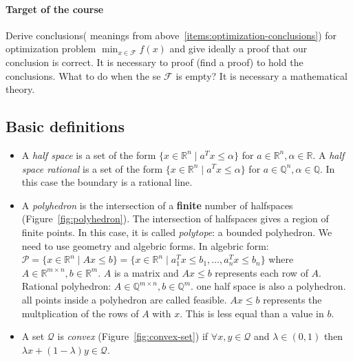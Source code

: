 \documentclass[main]{subfiles}
\begin{document}
\paragraph{Target of the course}
Derive conclusions( meanings from above~\ref{items:optimization-conclusions}) for optimization
problem $\displaystyle \min_{x \in \mathcal{F}} f(x)$ and give ideally a proof
that our conclusion is correct. It is necessary to proof (find a proof) to hold
the conclusions. What to do when the se $\mathcal{F}$ is empty? It is necessary
a mathematical theory.


\subsection{Basic definitions}
\begin{itemize}
\item A \emph{half space} is a set of the form $\{ x \in \mathbb{R}^{n} \mid
a^{T} x \leq \alpha \}$ for $a \in \mathbb{R}^{n}, \alpha \in \mathbb{R}$.
\subitem A \emph{half space rational} is a set of the form $\{ x \in
\mathbb{R}^{n} \mid a^{T} x \leq \alpha \}$ for $a \in \mathbb{Q}^{n}, \alpha
\in \mathbb{Q}$. In this case the boundary is a rational line.

\item A \emph{polyhedron} is the intersection of a \textbf{finite} number of
halfspaces (Figure~\ref{fig:polyhedron}). The intersection of halfspaces gives a
region of finite points. In this case, it is called \emph{polytope}: a bounded
polyhedron. We need to use geometry and algebric forms. In algebric form:
$\mathcal{P} = \{ x \in \mathbb{R}^{n} \mid Ax \leq b \} = \{ x \in
\mathbb{R}^{n} \mid a_{1}^{T}x \leq b_{1}, \dots, a_{n}^{T}x \leq b_{n} \}$
where $A \in \mathbb{R}^{m \times n}, b \in \mathbb{R}^{m}$. $A$ is a matrix
and $Ax \leq b$ represents each row of $A$.
\subitem Rational polyhedron: $A \in \mathbb{Q}^{ m \times n}, b \in
\mathbb{Q}^{m}$.
\subitem one half space is also a polyhedron.
\subitem all points inside a polyhedron are called feasible.
\subitem $Ax \leq b$ represents the multplication of the rows of $A$ with $x$. This is less equal than a value in $b$.

\item A set $\mathcal{Q}$ is \emph{convex} (Figure~\ref{fig:convex-set}) if
$\forall x, y \in \mathcal{Q}$ and $\lambda \in (0,1)$ then $\lambda x +
(1 - \lambda)y \in \mathcal{Q}$.


\end{itemize}
\end{document}
